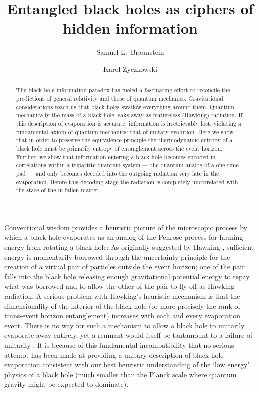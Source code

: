 \documentclass[twocolumn,aps,prl]{revtex4}
\begin{document}
\title{Entangled black holes as ciphers of hidden information}

\author{Samuel L.\ Braunstein}
\author{Karol \.{Z}yczkowski}

\begin{abstract}
The black-hole information paradox has fueled a fascinating effort to
reconcile the predictions of general relativity and those of quantum
mechanics. Gravitational considerations teach us that black holes swallow
everything around them. Quantum mechanically the mass of a black hole leaks
away as featureless (Hawking) radiation. If this
description of evaporation is accurate, information is irretrievably lost,
violating a fundamental axiom of quantum mechanics: that of unitary
evolution. Here we show that in order to preserve the
equivalence principle the thermodynamic entropy of a black hole must
be primarily entropy of entanglement across the event horizon.
Further, we show that information entering a black hole becomes encoded
in correlations within a tripartite quantum system --- the quantum analog
of a one-time pad --- and only becomes decoded into
the outgoing radiation very late in the evaporation. Before this decoding
stage the radiation is completely uncorrelated with the state of the
in-fallen matter.
\end{abstract}

\maketitle

Conventional wisdom provides a heuristic picture of the microscopic
process by which a black hole evaporates as an analog of the Penrose
process \cite{Penrose69} for farming energy from rotating a black hole:
As originally suggested by Hawking \cite{Hawking75}, sufficient energy
is momentarily borrowed through the uncertainty principle for the
creation of a virtual pair of particles outside the event horizon;
one of the pair falls into the black hole releasing enough
gravitational potential energy to repay what was borrowed and to
allow the other of the pair to fly off as Hawking radiation. A
serious problem with Hawking's heuristic mechanism is that the
dimensionality of the interior of the black hole (or more precisely
the rank of trans-event horizon entanglement) increases with each and
every evaporation event. There is no way for such a mechanism to
allow a black hole to unitarily evaporate away entirely, yet a
remnant would itself be tantamount to a failure of
unitarily \cite{Giddings95}. It is because of this fundamental
incompatibility that no serious attempt has been made at providing
a unitary description of black hole evaporation consistent with our
best heuristic understanding of the `low energy' physics of a
black hole (much smaller than the Planck scale where quantum gravity
might be expected to dominate).
\end{document}
